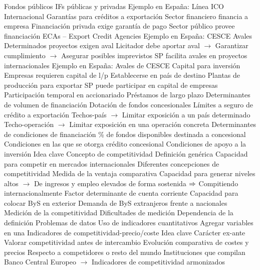 \documentclass{nuevotema}
\begin{document}
\begin{esquemal}
				\4[] Fondos públicos
				\4[] IFs públicas y privadas
				\4 Ejemplo en España:
				\4[] Línea ICO Internacional
			\3 Garantías para créditos a exportación
				\4 Sector financiero financia a empresa
				\4 Financiación privada exige garantía de pago
				\4 Sector público provee financiación
				\4 ECAs -- Export Credit Agencies
				\4 Ejemplo en España:
				\4[] CESCE
			\3 Avales
				\4 Determinados proyectos exigen aval
				\4[] Licitador debe aportar aval
				\4[] $\to$ Garantizar cumplimiento
				\4[] $\to$ Asegurar posibles imprevistos
				\4 SP facilita avales en proyectos internacionales
				\4 Ejemplo en España:
				\4[] Avales de CESCE
			\3 Capital para inversión
				\4 Empresas requieren capital de l/p
				\4[] Establecerse en país de destino
				\4[] Plantas de producción para exportar
				\4 SP puede participar en capital de empresas
				\4[] Participación temporal en accionariado
				\4[] Préstamos de largo plazo
			\3 Determinantes de volumen de financiación
				\4 Dotación de fondos concesionales
				\4 Límites a seguro de crédito a exportación
				\4[] Techos-país
				\4[] $\to$ Limitar exposición a un país determinado
				\4[] Techo-operación
				\4[] $\to$ Limitar exposición en una operación concreta
			\3 Determinantes de condiciones de financiación
				\4 \% de fondos disponibles destinada a concesional
				\4 Condiciones en las que se otorga crédito concesional
				\4 Condiciones de apoyo a la inversión
	\1 
		\2 Idea clave
			\3 Concepto de competitividad
				\4 Definición genérica
				\4[] Capacidad para competir en mercados internacionales
				\4 Diferentes concepciones de competitividad
				\4[] Medida de la ventaja comparativa
				\4[] Capacidad para generar niveles altos
				\4[] $\to$ De ingresos y empleo elevados de forma sostenida
				\4[] $\then$ Compitiendo internacionalmente
				\4 Factor determinante de cuenta corriente
				\4[] Capacidad para colocar ByS en exterior
				\4[] Demanda de ByS extranjeros frente a nacionales
			\3 Medición de la competitividad
				\4 Dificultades de medición
				\4[] Dependencia de la definición
				\4[] Problemas de datos
				\4[$\then$] Uso de indicadores cuantitativos
				\4[] Agregar variables en una
		\2 Indicadores de competitividad-precio/coste
			\3 Idea clave
				\4 Carácter ex-ante
				\4[] Valorar competitividad antes de intercambio
				\4 Evolución comparativa de costes y precios
				\4[] Respecto a competidores o resto del mundo
				\4 Instituciones que compilan
				\4[] Banco Central Europeo
				\4[] $\to$ Indicadores de competitividad armonizados

\end{esquemal}
\end{document}
